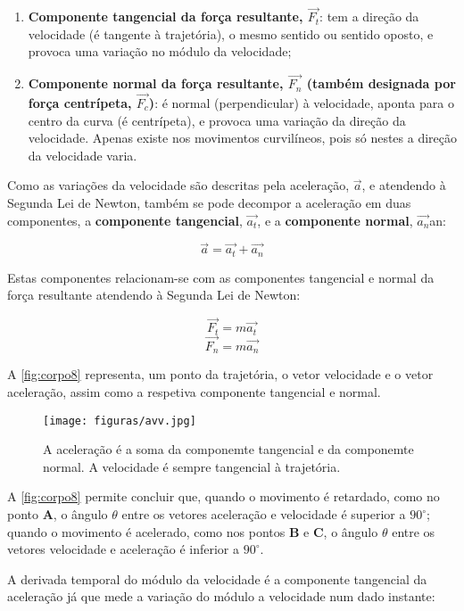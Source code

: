 \documentclass[a4paper,11pt,oneside]{report}
\begin{document}
\begin{enumerate}
    \item \textbf{Componente tangencial da força resultante, $\overrightarrow{F_t}$}: tem a direção da velocidade (é tangente à trajetória), o mesmo sentido ou sentido oposto, e provoca uma variação no módulo da velocidade;
    \item \textbf{Componente normal da força resultante, $\overrightarrow{F_n}$ (também designada por força centrípeta, $\overrightarrow{F_c}$)}: é normal (perpendicular) à velocidade, aponta para o centro da curva (é centrípeta), e provoca uma variação da direção da velocidade. Apenas existe nos movimentos curvilíneos, pois só nestes a direção da velocidade varia.
\end{enumerate}

Como as variações da velocidade são descritas pela aceleração, $\vec a$, 
e atendendo à Segunda Lei de Newton, também se pode decompor a aceleração 
em duas componentes, a \textbf{componente tangencial}, $\overrightarrow{a_t}$, 
e a \textbf{componente normal}, $\overrightarrow{a_n}$an: 

\[
\vec a = \overrightarrow{a_t} + \overrightarrow{a_n}
\]

Estas componentes relacionam-se com as componentes tangencial e
normal da força resultante atendendo à Segunda Lei de Newton:

\[
\overrightarrow{F_t} = m\overrightarrow{a_t} 
\]
\[
\overrightarrow{F_n} = m\overrightarrow{a_n}
\]

A \autoref{fig:corpo8} representa, um ponto da trajetória, o vetor velocidade 
e o vetor aceleração, assim como a respetiva componente tangencial e 
normal.

\begin{figure}[H]
    \center
    \texttt{[image: figuras/avv.jpg]}
    \caption{A aceleração é a soma da componemte tangencial e da componemte normal.
    A velocidade é sempre tangencial à trajetória.}
    \label{fig:corpo8}
\end{figure}

A \autoref{fig:corpo8} permite concluir que, quando o movimento é retardado, como no 
ponto \textbf{A}, o ângulo $\theta$ entre os vetores aceleração e velocidade 
é superior a $90^\circ$; quando o movimento é acelerado, como nos pontos \textbf{B} 
e \textbf{C}, o ângulo $\theta$ entre os vetores velocidade e aceleração é inferior 
a $90^\circ$. 

A derivada temporal do módulo da velocidade é a componente tangencial da 
aceleração já que mede a variação do módulo a velocidade num dado instante:
\end{document}
